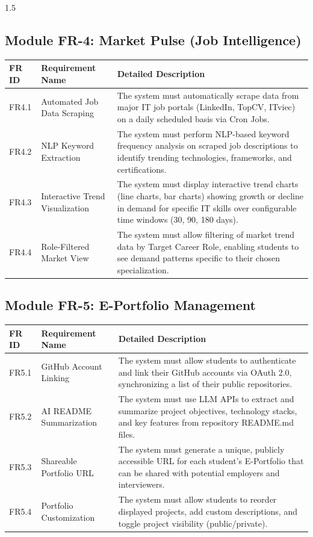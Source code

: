 \documentclass[12pt,a4paper]{report}
\begin{document}
\begin{spacing}{1.5}
		\subsection{Module FR-4: Market Pulse (Job Intelligence)}
		
		\begin{longtable}{|p{2cm}|p{4cm}|p{9cm}|}
			\hline
			\rowcolor{mainblue!15}\textbf{FR ID} & \textbf{Requirement Name} & \textbf{Detailed Description} \\ \hline
			FR4.1 & Automated Job Data Scraping & The system must automatically scrape data from major IT job portals (LinkedIn, TopCV, ITviec) on a daily scheduled basis via Cron Jobs. \\ \hline
			FR4.2 & NLP Keyword Extraction & The system must perform NLP-based keyword frequency analysis on scraped job descriptions to identify trending technologies, frameworks, and certifications. \\ \hline
			FR4.3 & Interactive Trend Visualization & The system must display interactive trend charts (line charts, bar charts) showing growth or decline in demand for specific IT skills over configurable time windows (30, 90, 180 days). \\ \hline
			FR4.4 & Role-Filtered Market View & The system must allow filtering of market trend data by Target Career Role, enabling students to see demand patterns specific to their chosen specialization. \\ \hline
		\end{longtable}
		
		\subsection{Module FR-5: E-Portfolio Management}
		
		\begin{longtable}{|p{2cm}|p{4cm}|p{9cm}|}
			\hline
			\rowcolor{mainblue!15}\textbf{FR ID} & \textbf{Requirement Name} & \textbf{Detailed Description} \\ \hline
			FR5.1 & GitHub Account Linking & The system must allow students to authenticate and link their GitHub accounts via OAuth 2.0, synchronizing a list of their public repositories. \\ \hline
			FR5.2 & AI README Summarization & The system must use LLM APIs to extract and summarize project objectives, technology stacks, and key features from repository README.md files. \\ \hline
			FR5.3 & Shareable Portfolio URL & The system must generate a unique, publicly accessible URL for each student's E-Portfolio that can be shared with potential employers and interviewers. \\ \hline
			FR5.4 & Portfolio Customization & The system must allow students to reorder displayed projects, add custom descriptions, and toggle project visibility (public/private). \\ \hline
		\end{longtable}
		

\end{spacing}
\end{document}
